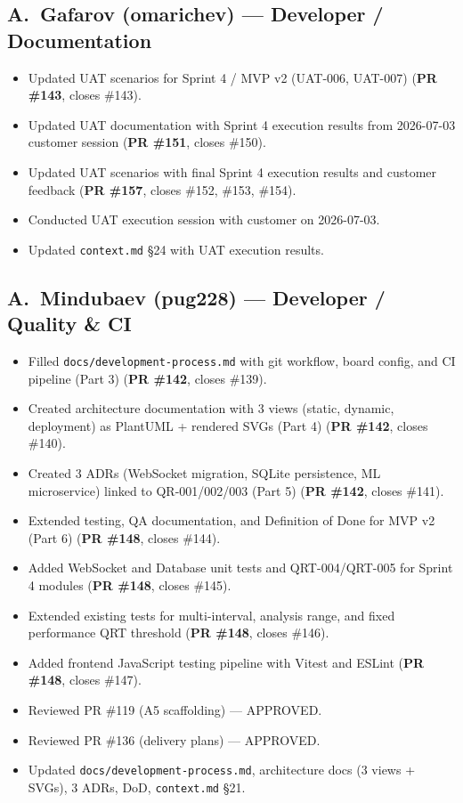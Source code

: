 \documentclass[11pt,a4paper]{article}
\begin{document}
\subsection{A.~Gafarov (omarichev) --- Developer / Documentation}
\begin{itemize}[leftmargin=*]
    \item Updated UAT scenarios for Sprint 4 / MVP v2 (UAT-006, UAT-007) (\textbf{PR \#143}, closes \#143).
    \item Updated UAT documentation with Sprint 4 execution results from 2026-07-03 customer session (\textbf{PR \#151}, closes \#150).
    \item Updated UAT scenarios with final Sprint 4 execution results and customer feedback (\textbf{PR \#157}, closes \#152, \#153, \#154).
    \item Conducted UAT execution session with customer on 2026-07-03.
    \item Updated \texttt{context.md} \S24 with UAT execution results.
\end{itemize}

\subsection{A.~Mindubaev (pug228) --- Developer / Quality \& CI}
\begin{itemize}[leftmargin=*]
    \item Filled \texttt{docs/development-process.md} with git workflow, board config, and CI pipeline (Part 3) (\textbf{PR \#142}, closes \#139).
    \item Created architecture documentation with 3 views (static, dynamic, deployment) as PlantUML + rendered SVGs (Part 4) (\textbf{PR \#142}, closes \#140).
    \item Created 3 ADRs (WebSocket migration, SQLite persistence, ML microservice) linked to QR-001/002/003 (Part 5) (\textbf{PR \#142}, closes \#141).
    \item Extended testing, QA documentation, and Definition of Done for MVP v2 (Part 6) (\textbf{PR \#148}, closes \#144).
    \item Added WebSocket and Database unit tests and QRT-004/QRT-005 for Sprint 4 modules (\textbf{PR \#148}, closes \#145).
    \item Extended existing tests for multi-interval, analysis range, and fixed performance QRT threshold (\textbf{PR \#148}, closes \#146).
    \item Added frontend JavaScript testing pipeline with Vitest and ESLint (\textbf{PR \#148}, closes \#147).
    \item Reviewed PR \#119 (A5 scaffolding) --- APPROVED.
    \item Reviewed PR \#136 (delivery plans) --- APPROVED.
    \item Updated \texttt{docs/development-process.md}, architecture docs (3 views + SVGs), 3 ADRs, DoD, \texttt{context.md} \S21.
\end{itemize}
\end{document}
